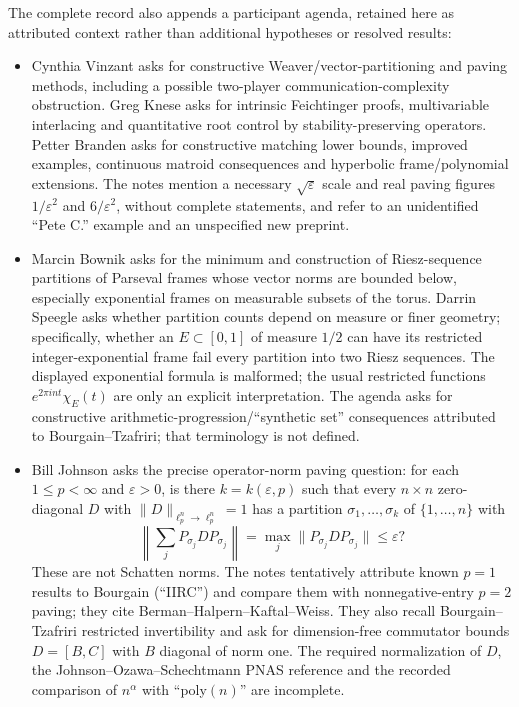 \documentclass[11pt]{article}
\begin{document}
The complete record also appends a participant agenda, retained here as attributed context rather than additional hypotheses or resolved results:
\begin{itemize}
\item Cynthia Vinzant asks for constructive Weaver/vector-partitioning and paving methods, including a possible two-player communication-complexity obstruction. Greg Knese asks for intrinsic Feichtinger proofs, multivariable interlacing and quantitative root control by stability-preserving operators. Petter Branden asks for constructive matching lower bounds, improved examples, continuous matroid consequences and hyperbolic frame/polynomial extensions. The notes mention a necessary $\sqrt\varepsilon$ scale and real paving figures $1/\varepsilon^2$ and $6/\varepsilon^2$, without complete statements, and refer to an unidentified ``Pete C.'' example and an unspecified new preprint.
\item Marcin Bownik asks for the minimum and construction of Riesz-sequence partitions of Parseval frames whose vector norms are bounded below, especially exponential frames on measurable subsets of the torus. Darrin Speegle asks whether partition counts depend on measure or finer geometry; specifically, whether an $E\subset[0,1]$ of measure $1/2$ can have its restricted integer-exponential frame fail every partition into two Riesz sequences. The displayed exponential formula is malformed; the usual restricted functions $e^{2\pi int}\chi_E(t)$ are only an explicit interpretation. The agenda asks for constructive arithmetic-progression/``synthetic set'' consequences attributed to Bourgain--Tzafriri; that terminology is not defined.
\item Bill Johnson asks the precise operator-norm paving question: for each $1\leq p<\infty$ and $\varepsilon>0$, is there $k=k(\varepsilon,p)$ such that every $n\times n$ zero-diagonal $D$ with $\|D\|_{\ell_p^n\to\ell_p^n}=1$ has a partition $\sigma_1,\ldots,\sigma_k$ of $\{1,\ldots,n\}$ with
\[
 \left\|\sum_jP_{\sigma_j}DP_{\sigma_j}\right\|
 =\max_j\|P_{\sigma_j}DP_{\sigma_j}\|\leq\varepsilon?
\]
These are not Schatten norms. The notes tentatively attribute known $p=1$ results to Bourgain (``IIRC'') and compare them with nonnegative-entry $p=2$ paving; they cite Berman--Halpern--Kaftal--Weiss. They also recall Bourgain--Tzafriri restricted invertibility and ask for dimension-free commutator bounds $D=[B,C]$ with $B$ diagonal of norm one. The required normalization of $D$, the Johnson--Ozawa--Schechtmann PNAS reference and the recorded comparison of $n^\alpha$ with ``poly$(n)$'' are incomplete.

\end{itemize}
\end{document}
